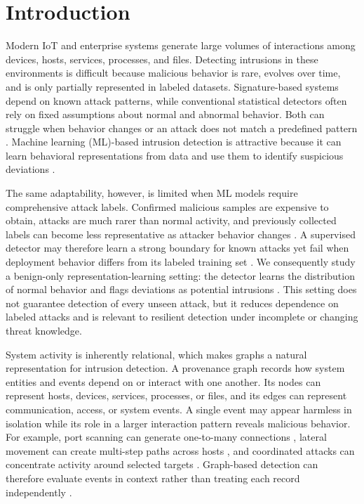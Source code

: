 \section{Introduction}\label{sec:introduction}

Modern IoT and enterprise systems generate large volumes of interactions among devices, hosts, services, processes, and files. Detecting intrusions in these environments is difficult because malicious behavior is rare, evolves over time, and is only partially represented in labeled datasets. Signature-based systems depend on known attack patterns, while conventional statistical detectors often rely on fixed assumptions about normal and abnormal behavior. Both can struggle when behavior changes or an attack does not match a predefined pattern \cite{Buczak2016,sommer2010outside}. Machine learning (ML)-based intrusion detection is attractive because it can learn behavioral representations from data and use them to identify suspicious deviations \cite{Buczak2016}.

The same adaptability, however, is limited when ML models require comprehensive attack labels. Confirmed malicious samples are expensive to obtain, attacks are much rarer than normal activity, and previously collected labels can become less representative as attacker behavior changes \cite{sommer2010outside,caville2022anomale}. A supervised detector may therefore learn a strong boundary for known attacks yet fail when deployment behavior differs from its labeled training set \cite{sommer2010outside}. We consequently study a benign-only representation-learning setting: the detector learns the distribution of normal behavior and flags deviations as potential intrusions \cite{manzoor2016streamspot,caville2022anomale}. This setting does not guarantee detection of every unseen attack, but it reduces dependence on labeled attacks and is relevant to resilient detection under incomplete or changing threat knowledge.

System activity is inherently relational, which makes graphs a natural representation for intrusion detection. A provenance graph records how system entities and events depend on or interact with one another. Its nodes can represent hosts, devices, services, processes, or files, and its edges can represent communication, access, or system events. A single event may appear harmless in isolation while its role in a larger interaction pattern reveals malicious behavior. For example, port scanning can generate one-to-many connections \cite{lee2003detection}, lateral movement can create multi-step paths across hosts \cite{fang2022lmtracker,zhou2024lmdetect}, and coordinated attacks can concentrate activity around selected targets \cite{bakar2024ftgnet}. Graph-based detection can therefore evaluate events in context rather than treating each record independently \cite{manzoor2016streamspot,lo2022egraphsage}.

